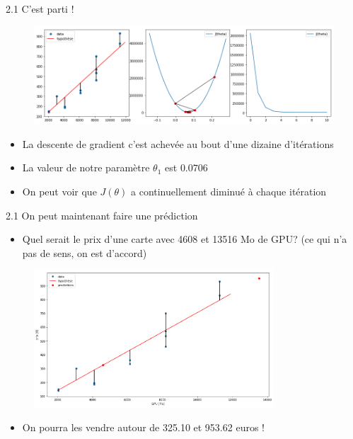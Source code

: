 \begin{frame}{2.1 C'est parti !}
  \begin{figure}
    \includegraphics[width=\textwidth]{fig/gradDescent.png}
  \end{figure}
  \begin{itemize}
  \item La descente de gradient c'est achevée au bout d'une dizaine d'itérations
  \item La valeur de notre paramètre $\theta_{1}$ est $0.0706$
  \item On peut voir que $J(\theta)$ a continuellement diminué à chaque itération
  \end{itemize}
\end{frame}

\begin{frame}{2.1 On peut maintenant faire une prédiction}
  \begin{itemize}
  \item Quel serait le prix d'une carte avec 4608 et 13516 Mo de GPU? (ce qui n'a pas de sens, on est d'accord)
  \end{itemize}
  \vspace{-0.2cm}
  \begin{figure}
    \includegraphics[width=0.8\textwidth]{fig/pred.png}
  \end{figure}
  \vspace{-0.5cm}
  \begin{itemize}
  \item On pourra les vendre autour de 325.10 et 953.62 euros !
  \end{itemize}
\end{frame}

